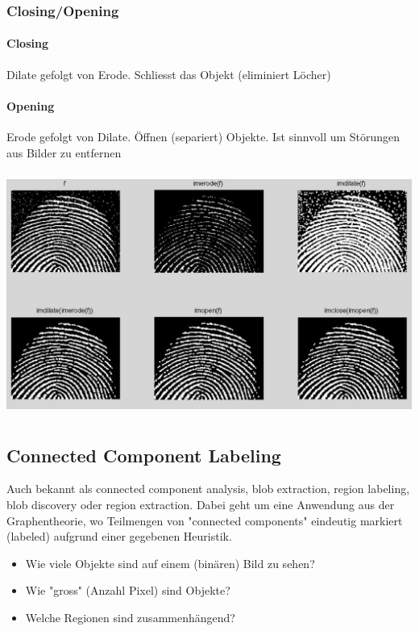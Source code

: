 \subsubsection{Closing/Opening}
\paragraph{Closing} Dilate gefolgt von Erode. Schliesst das Objekt (eliminiert Löcher)

\paragraph{Opening} Erode gefolgt von Dilate. Öffnen (separiert) Objekte. Ist sinnvoll um Störungen aus Bilder zu entfernen


\begin{center}

	\includegraphics[height=8cm,keepaspectratio]{images/sw01/BspOpenClosing.JPG}
\end{center}

\subsection{Connected Component Labeling}
Auch bekannt als connected component analysis, blob extraction, region labeling, blob discovery oder region extraction. Dabei geht um eine Anwendung aus der Graphentheorie, wo Teilmengen von "connected components" eindeutig markiert (labeled) aufgrund einer gegebenen Heuristik. 

\begin{itemize}
	\itemsep0pt
	\item Wie viele Objekte sind auf einem (binären) Bild zu sehen?
	\item Wie "gross" (Anzahl Pixel) sind Objekte?
	\item Welche Regionen sind zusammenhängend?

\end{itemize}

